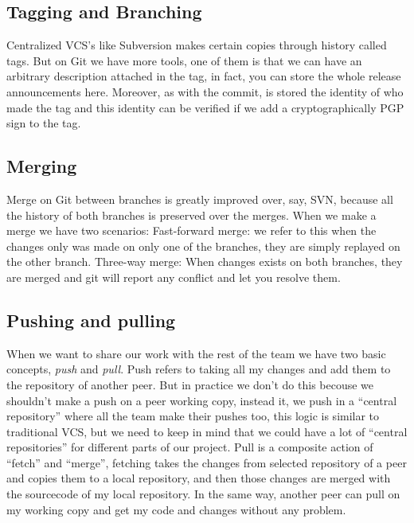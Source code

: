 \documentclass[%
	final,
	notitlepage,
	narroweqnarray,
	inline,
	twoside,
	]{ieee}
\begin{document}
\subsection{Tagging and Branching}


Centralized VCS's like Subversion makes certain copies through history called tags. 
But on Git we have more tools, one of them is that we can have an arbitrary 
description attached in the tag, in fact, you can store the whole release announcements here. 
Moreover, as with the commit, is stored the identity of who made the tag and this identity 
can be verified if we add a cryptographically PGP sign to the tag.

\subsection{Merging}

Merge on Git between branches is greatly improved over, say, SVN, because all the history of 
both branches is preserved over the merges.
When we make a merge we have two scenarios:
Fast-forward merge: we refer to this when the changes only was made on only one of the branches,
they are simply replayed on the other branch.
Three-way merge: When changes exists on both branches, they are merged and git will report any 
conflict and let you resolve them. 


\subsection{Pushing and pulling}

When we want to share our work with the rest of the team we have two basic concepts, 
\emph{push} and \emph{pull}.
Push refers to taking all my changes and add them to the repository of another peer. 
But in practice we don't do this becouse we shouldn't make a push on a peer working copy, 
instead it, we push in a ``central repository'' where all the team make their pushes too, 
this logic is similar to traditional VCS, but we need to keep in mind that we could have a 
lot of ``central repositories'' for different parts of our project.
Pull is a composite action of ``fetch'' and ``merge'', fetching takes the changes from selected 
repository of a peer and copies them to a local repository, and 
then those changes are merged with the sourcecode of my local repository.
In the same way, another peer can pull on my working copy and get my code and 
changes without any problem.
\end{document}
